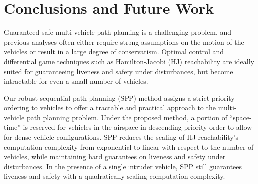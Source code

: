 \section{Conclusions and Future Work}
Guaranteed-safe multi-vehicle path planning is a challenging problem, and previous analyses often either require strong assumptions on the motion of the vehicles or result in a large degree of conservatism. Optimal control and differential game techniques such as Hamilton-Jacobi (HJ) reachability are ideally suited for guaranteeing liveness and safety under disturbances, but become intractable for even a small number of vehicles.

Our robust sequential path planning (SPP) method assigns a strict priority ordering to vehicles to offer a tractable and practical approach to the multi-vehicle path planning problem. Under the proposed method, a portion of ``space-time'' is reserved for vehicles in the airspace in descending priority order to allow for dense vehicle configurations. SPP reduces the scaling of HJ reachability's computation complexity from exponential to linear with respect to the number of vehicles, while maintaining hard guarantees on liveness and safety under disturbances. In the presence of a single intruder vehicle, SPP still guarantees liveness and safety with a quadratically scaling computation complexity.